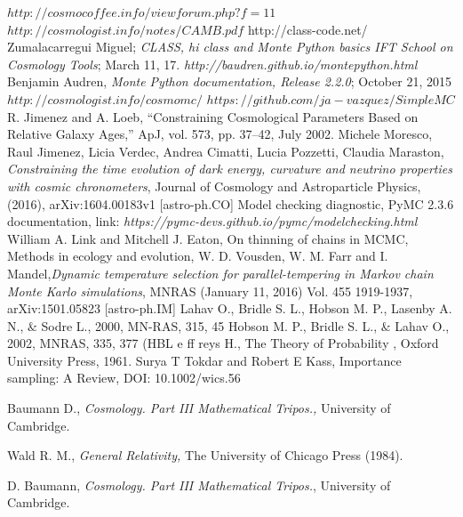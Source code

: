 \documentclass[onecolumn,           %
               showpacs,            %
               preprintnumbers,     %
               aps,                 %
               prl,          	    %
               letterpaper,             %
               superscriptaddress,      %
               nofootinbib,         %
               tightenlines,        %
               floats,floatfix      %
               ,usenatbib,
               ]{revtex4-1}
\begin{document}
\begin{thebibliography}{9}
$http://cosmocoffee.info/viewforum.php?f=11$
 $http://cosmologist.info/notes/CAMB.pdf$
 http://class-code.net/
Zumalacarregui Miguel; \textit{CLASS, hi class and Monte Python basics IFT School on Cosmology Tools}; March 11, 17.
\textit{http://baudren.github.io/montepython.html}
Benjamin Audren, \textit{Monte Python documentation, Release 2.2.0}; October 21, 2015
$http://cosmologist.info/cosmomc/$	
$https://github.com/ja-vazquez/SimpleMC$
%
%
%
%
%
%
R. Jimenez and A. Loeb, “Constraining Cosmological Parameters Based on Relative Galaxy Ages,”
ApJ, vol. 573, pp. 37–42, July 2002.
Michele Moresco, Raul Jimenez, Licia Verdec, Andrea Cimatti, Lucia Pozzetti, Claudia Maraston, \textit{Constraining the time evolution of dark energy, curvature and neutrino properties with cosmic chronometers}, Journal of Cosmology and Astroparticle Physics, (2016), arXiv:1604.00183v1 [astro-ph.CO]
 Model checking diagnostic, PyMC 2.3.6 documentation, link: \textit{https://pymc-devs.github.io/pymc/modelchecking.html}
William A. Link and Mitchell J. Eaton, On thinning of chains in MCMC, Methods in ecology and evolution,
W. D. Vousden, W. M. Farr and I. Mandel,\textit{Dynamic temperature selection for parallel-tempering in Markov chain Monte Karlo simulations}, MNRAS (January 11, 2016) Vol. 455 1919-1937, arXiv:1501.05823 [astro-ph.IM]
Lahav O., Bridle S. L., Hobson M. P., Lasenby A. N., $\&$ Sodre L., 2000, MN-RAS, 315, 45
Hobson M. P., Bridle S. L., $\&$ Lahav O., 2002, MNRAS, 335, 377 (HBL
e
ff
reys H.,
The Theory of Probability
, Oxford University Press, 1961.
Surya T Tokdar and Robert E Kass, Importance sampling: A Review, DOI: 10.1002/wics.56

 Baumann D., \textit{Cosmology. Part III Mathematical Tripos.,} University of Cambridge.

 Wald R. M., \textit{General Relativity,} The University of Chicago Press (1984).

 D. Baumann, {\em Cosmology. Part III Mathematical Tripos.}, University of Cambridge.

\end{thebibliography}
\end{document}
